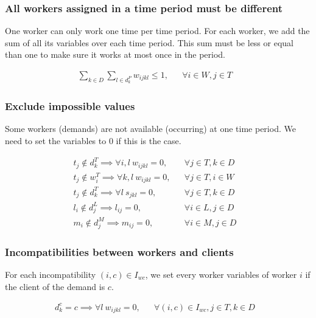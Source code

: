 \documentclass[../../thesis.tex]{subfiles}
\begin{document}
\subsubsection{All workers assigned in a time period must be different}

One worker can only work one time per time period. For each worker, we add the sum of all its variables 
over each time period. This sum must be less or equal than one to make sure it works at most once in the period.

\begin{align}
  \sum_{k \in D} \sum_{l \in d_k^P} w_{ijkl} \leq 1, && \forall i \in W, j \in T & \label{wc2} 
\end{align}


\subsubsection{Exclude impossible values}

Some workers (demands) are not available (occurring) at one time period. We need to set the variables to 0 if this is the case.

\begin{align}
  t_j \notin d^T_{k} \implies \forall i, l \ w_{ijkl} = 0,  && \forall j \in T , k \in D &\label{wc3} \\
  t_j \notin w^T_{i} \implies \forall k, l \ w_{ijkl} = 0, && \forall j \in T, i \in W &\label{wc4} \\
  t_j \notin d^T_{k} \implies \forall l \ s_{jkl} = 0,  && \forall j \in T , k \in D &\label{sc1} \\ 
  l_i \notin d^L_j \implies l_{ij} = 0, && \forall i \in L, j \in D& \label{lc1} \\ 
  m_i \notin d^M_j \implies m_{ij} = 0, && \forall i \in M, j \in D& \label{mc1} 
\end{align}


\subsubsection{Incompatibilities between workers and clients}

For each incompatibility $(i, c) \in I_{wc}$, we set every worker variables of worker $i$ if the client of the 
demand is $c$.

\begin{align}
  d^c_{k} = c \implies \forall l \ w_{ijkl} = 0, && \forall {(i, c) \in I_{wc}}, j \in T, k \in D &\label{wc6}
\end{align}
\end{document}
